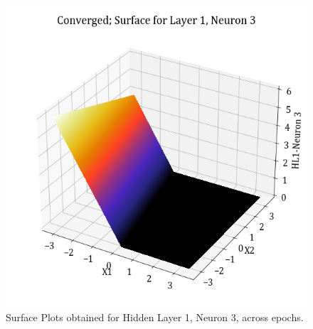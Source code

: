\documentclass[11pt,a4paper]{article}
\begin{document}
\begin{figure}[H]
    \includegraphics[scale=0.4]{images/1B_MLFFNN_conv_HL1_N3.png}
    \caption{Surface Plots obtained for Hidden Layer 1, Neuron 3, across epochs.}
\end{figure}
\end{document}
